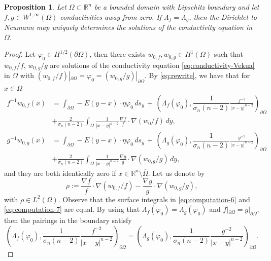 \documentclass[12pt]{article}
\newtheorem{proposition}[theorem]{Proposition}
\begin{document}
\begin{proposition}\label{prop:extensions-equal}
    Let $\Omega\subset \mathbb{R}^n$ be a bounded domain with Lipschitz boundary and let $f, g\in W^{1,\infty}(\Omega)$ conductivities away from zero. If $\Lambda_f=\Lambda_g$, then the Dirichlet-to-Neumann map uniquely determines the solutions of the conductivity equation in $\Omega$.
\end{proposition}
\begin{proof}
Let $\varphi_0\in H^{1/2}(\partial\Omega)$, then there exists $w_{0,f}, w_{0,g}\in H^1(\Omega)$ such that $w_{0,f}/f$, $w_{0,g}/g$ are solutions of the conductivity equation \eqref{eq:conductivity-Vekua} in $\Omega$ with $(w_{0,f}/f)|_{\partial\Omega}=\varphi_0=(w_{0,g}/g)|_{\partial\Omega}$.
By \eqref{eq:rewrite}, we have that for $x\in \Omega$
\begin{align}\label{eq:computation-6}
f^{-1}w_{0,f}(x)&=\int_{\partial\Omega} -E(y-x)\cdot \eta \varphi_0 \, ds_y \,+\, \left(\Lambda_{f}(\varphi_0),\dfrac{1}{\sigma_n(n-2)}\frac{f^{-2}}{|x-y|^{n-2}}\right)_{\partial\Omega} \\
&+\frac{2}{\sigma_n(n-2)}\int_{\Omega} \frac{1}{|x-y|^{n-2}} \frac{\nabla f}{f}\cdot \nabla(w_0/f)\, dy, \nonumber \\
g^{-1}w_{0,g}(x)&=\int_{\partial\Omega} -E(y-x)\cdot \eta \varphi_0 \, ds_y \,+\, \left(\Lambda_{g}(\varphi_0),\dfrac{1}{\sigma_n(n-2)}\frac{g^{-2}}{|x-y|^{n-2}}\right)_{\partial\Omega}\label{eq:computation-7}\\
&+\frac{2}{\sigma_n(n-2)}\int_{\Omega} \frac{1}{|x-y|^{n-2}}\frac{\nabla g}{g}\cdot \nabla(w_{0,g}/g)\, dy,\nonumber
\end{align}
and they are both identically zero if $x\in \mathbb{R}^n\setminus \overline{\Omega}$.
Let us denote by 
\begin{equation*}
\rho:=\frac{\nabla f}{f}\cdot \nabla(w_{0,f}/f)-\frac{\nabla g}{g}\cdot \nabla(w_{0,g}/g), 
\end{equation*}
with $\rho\in L^2(\Omega)$. Observe that the surface integrals in \eqref{eq:computation-6} and \eqref{eq:computation-7} are equal. By using that $\Lambda_f(\varphi_0)=\Lambda_g(\varphi_0)$ and $f|_{\partial\Omega}=g|_{\partial\Omega}$, then the pairings in the boundary satisfy
\begin{equation*}
    \left(\Lambda_{f}(\varphi_0),\dfrac{1}{\sigma_n(n-2)}\frac{f^{-2}}{|x-y|^{n-2}}\right)_{\partial\Omega}=\left(\Lambda_{g}(\varphi_0),\dfrac{1}{\sigma_n(n-2)}\frac{g^{-2}}{|x-y|^{n-2}}\right)_{\partial\Omega}.

\end{equation*}
\end{proof}
\end{document}
